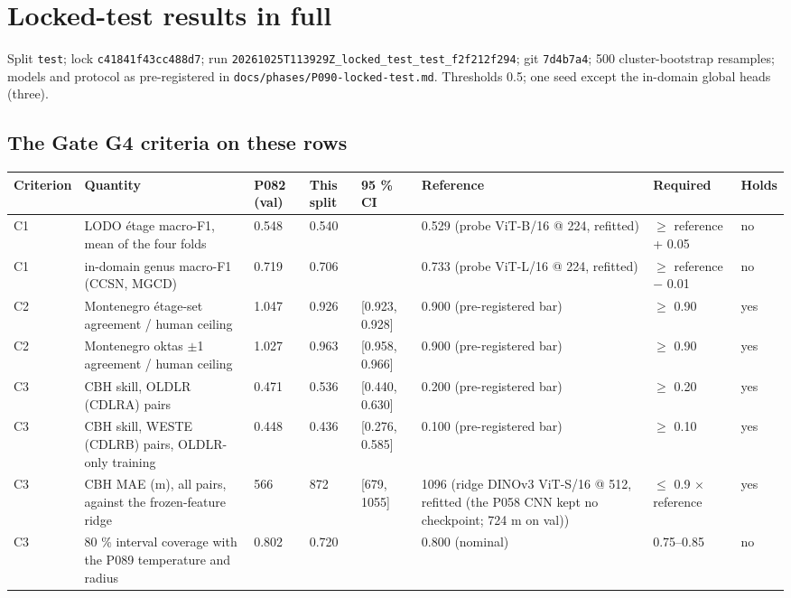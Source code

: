 \section{Locked-test results in full}

Split \texttt{test}; lock \texttt{c41841f43cc488d7}; run \texttt{20261025T113929Z\_\allowbreak{}locked\_\allowbreak{}test\_\allowbreak{}test\_\allowbreak{}f2f212f294}; git \texttt{7d4b7a4}; 500 cluster-bootstrap resamples; models and protocol as pre-registered in \texttt{docs/phases/P090-locked-test.md}. Thresholds 0.5; one seed except the in-domain global heads (three).

\subsection{The Gate G4 criteria on these rows}

\begin{center}{\scriptsize\setlength{\tabcolsep}{3pt}
\begin{tabular}{lp{3.3cm}lllp{5.0cm}ll}
\toprule
Criterion & Quantity & P082 (val) & This split & 95 \% CI & Reference & Required & Holds \\
\midrule
C1 & LODO étage macro-F1, mean of the four folds & 0.548 & 0.540 &  & 0.529 (probe ViT-B/16 @ 224, refitted) & $\geq$ reference + 0.05 & no \\
C1 & in-domain genus macro-F1 (CCSN, MGCD) & 0.719 & 0.706 &  & 0.733 (probe ViT-L/16 @ 224, refitted) & $\geq$ reference $-$ 0.01 & no \\
C2 & Montenegro étage-set agreement / human ceiling & 1.047 & 0.926 & [0.923, 0.928] & 0.900 (pre-registered bar) & $\geq$ 0.90 & yes \\
C2 & Montenegro oktas $\pm$1 agreement / human ceiling & 1.027 & 0.963 & [0.958, 0.966] & 0.900 (pre-registered bar) & $\geq$ 0.90 & yes \\
C3 & CBH skill, OLDLR (CDLRA) pairs & 0.471 & 0.536 & [0.440, 0.630] & 0.200 (pre-registered bar) & $\geq$ 0.20 & yes \\
C3 & CBH skill, WESTE (CDLRB) pairs, OLDLR-only training & 0.448 & 0.436 & [0.276, 0.585] & 0.100 (pre-registered bar) & $\geq$ 0.10 & yes \\
C3 & CBH MAE (m), all pairs, against the frozen-feature ridge & 566 & 872 & [679, 1055] & 1096 (ridge DINOv3 ViT-S/16 @ 512, refitted (the P058 CNN kept no checkpoint; 724 m on val)) & $\leq$ 0.9 $\times$ reference & yes \\
C3 & 80 \% interval coverage with the P089 temperature and radius & 0.802 & 0.720 &  & 0.800 (nominal) & 0.75–0.85 & no \\
\bottomrule
\end{tabular}}
\end{center}


